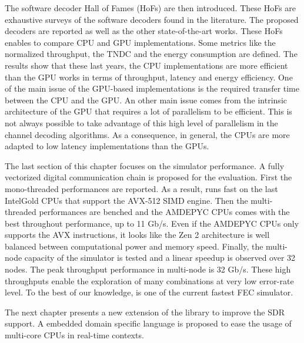 The software decoder Hall of Fames (HoFs) are then introduced. These HoFs are
exhaustive surveys of the software decoders found in the literature. The
proposed decoders are reported as well as the other state-of-the-art works.
These HoFs enables to compare CPU and GPU implementations. Some metrics like the
normalized throughput, the TNDC and the energy consumption are defined. The
results show that these last years, the CPU implementations are more efficient
than the GPU works in terms of throughput, latency and energy efficiency. One of
the main issue of the GPU-based implementations is the required transfer time
between the CPU and the GPU. An other main issue comes from the intrinsic
architecture of the GPU that requires a lot of parallelism to be efficient. This
is not always possible to take advantage of this high level of parallelism in
the channel decoding algorithms. As a consequence, in general, the CPUs are more
adapted to low latency implementations than the GPUs.

The last section of this chapter focuses on the \AFFECT simulator performance.
A fully vectorized digital communication chain is proposed for the evaluation.
First the mono-threaded performances are reported. As a result, \AFFECT runs
fast on the last Intel\R Gold CPUs that support the AVX-512 SIMD engine.
Then the multi-threaded performances are benched and the AMD\R EPYC CPUs comes
with the best throughout performance, up to 11 Gb/s. Even if the AMD\R EPYC CPUs
only supports the AVX instructions, it looks like the Zen 2 architecture is well
balanced between computational power and memory speed. Finally, the multi-node
capacity of the \AFFECT simulator is tested and a linear speedup is observed
over 32 nodes. The peak throughput performance in multi-node is 32 Gb/s. These
high throughputs enable the exploration of many combinations at very low
error-rate level. To the best of our knowledge, \AFFECT is one of the current
fastest FEC simulator.

The next chapter presents a new extension of the \AFFECT library to improve the
SDR support. A embedded domain specific language is proposed to ease the usage
of multi-core CPUs in real-time contexts.